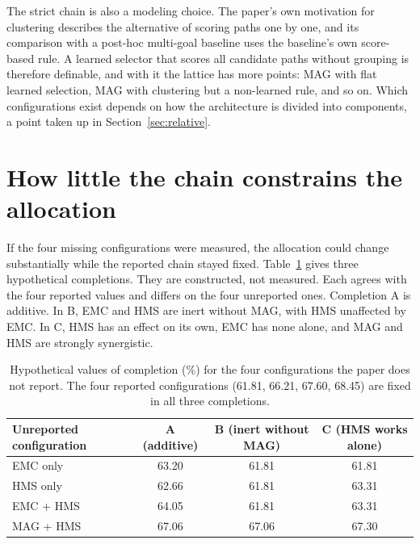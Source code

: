 \documentclass[11pt]{article}
\theoremstyle{plain}
\theoremstyle{remark}
\begin{document}
The strict chain is also a modeling choice. The paper's own motivation for clustering describes the alternative of scoring paths one by one, and its comparison with a post-hoc multi-goal baseline uses the baseline's own score-based rule. A learned selector that scores all candidate paths without grouping is therefore definable, and with it the lattice has more points: MAG with flat learned selection, MAG with clustering but a non-learned rule, and so on. Which configurations exist depends on how the architecture is divided into components, a point taken up in Section~\ref{sec:relative}.

\section{How little the chain constrains the allocation}\label{sec:completions}

If the four missing configurations were measured, the allocation could change substantially while the reported chain stayed fixed. Table~\ref{tab:comp} gives three hypothetical completions. They are constructed, not measured. Each agrees with the four reported values and differs on the four unreported ones. Completion A is additive. In B, EMC and HMS are inert without MAG, with HMS unaffected by EMC. In C, HMS has an effect on its own, EMC has none alone, and MAG and HMS are strongly synergistic.

\begin{table}[ht]
\centering\small
\begin{tabular}{lccc}
\toprule
Unreported configuration & A (additive) & B (inert without MAG) & C (HMS works alone)\\
\midrule
EMC only & 63.20 & 61.81 & 61.81\\
HMS only & 62.66 & 61.81 & 63.31\\
EMC + HMS & 64.05 & 61.81 & 63.31\\
MAG + HMS & 67.06 & 67.06 & 67.30\\
\bottomrule
\end{tabular}
\caption{Hypothetical values of completion (\%) for the four configurations the paper does not report. The four reported configurations (61.81, 66.21, 67.60, 68.45) are fixed in all three completions.}\label{tab:comp}
\end{table}
\end{document}
